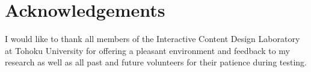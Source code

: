\documentclass{article}
\begin{document}
\section{Acknowledgements}

I would like to thank all members of the Interactive Content Design Laboratory at Tohoku University for offering a pleasant environment and feedback to my research as well as all past and future volunteers for their patience during testing.

\newpage



\end{document}
